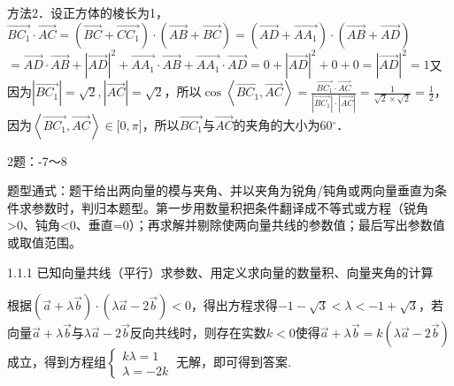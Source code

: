 方法2．设正方体的棱长为1，\(\overrightarrow{BC_{1}} \cdot \overrightarrow{AC} = \allowbreak\left( \overrightarrow{BC} + \overrightarrow{CC_{1}} \right) \cdot \allowbreak\left( \overrightarrow{AB} + \overrightarrow{BC} \right) = \allowbreak\left( \overrightarrow{AD} + \overrightarrow{AA_{1}} \right) \cdot \allowbreak\left( \overrightarrow{AB} + \overrightarrow{AD} \right)\)\(= \overrightarrow{AD} \cdot \overrightarrow{AB} + \left| \overrightarrow{AD} \right|^{2} + \overrightarrow{AA_{1}} \cdot \overrightarrow{AB} + \overrightarrow{AA_{1}} \cdot \overrightarrow{AD} = 0 + \left| \overrightarrow{AD} \right|^{2} + 0 + 0 = \allowbreak\left| \overrightarrow{AD} \right|^{2} = 1\)又因为\(\left| \overrightarrow{BC_{1}} \right| = \sqrt{2},\left| \overrightarrow{AC} \right| = \sqrt{2}\)，所以\(\cos\left\langle \overrightarrow{BC_{1}},\overrightarrow{AC} \right\rangle = \frac{\overrightarrow{BC_{1}} \cdot \overrightarrow{AC}}{\left| \overrightarrow{BC_{1}} \right| \cdot \allowbreak\left| \overrightarrow{AC} \right|} = \frac{1}{\sqrt{2} \times \sqrt{2}} = \frac{1}{2}\)，
因为\(\left\langle \overrightarrow{BC_{1}},\overrightarrow{AC} \right\rangle \in \lbrack 0,\pi\rbrack\)，所以\(\overrightarrow{BC_{1}}\)与\(\overrightarrow{AC}\)的夹角的大小为\(60{^\circ}\)．


2题：-7～8

题型通式：题干给出两向量的模与夹角、并以夹角为锐角/钝角或两向量垂直为条件求参数时，判归本题型。第一步用数量积把条件翻译成不等式或方程（锐角\textgreater0、钝角\textless0、垂直=0）；再求解并剔除使两向量共线的参数值；最后写出参数值或取值范围。


\noindent\hangindent=7mm\quad{}1.1.1 已知向量共线（平行）求参数、用定义求向量的数量积、向量夹角的计算

根据\(\left( \overrightarrow{a} + \lambda\overrightarrow{b} \right) \cdot \allowbreak\left( \lambda\overrightarrow{a} - 2\overrightarrow{b} \right) < 0\)，得出方程求得\(- 1 - \sqrt{3} < \lambda < - 1 + \sqrt{3}\)，若向量\(\overrightarrow{a} + \lambda\overrightarrow{b}\)与\(\lambda\overrightarrow{a} - 2\overrightarrow{b}\)反向共线时，则存在实数\(k < 0\)使得\(\overrightarrow{a} + \lambda\overrightarrow{b} = k(\lambda\overrightarrow{a} - 2\overrightarrow{b})\)成立，得到方程组\(\left\{ \begin{array}{r}
k\lambda = 1 \\
\lambda = - 2k
\end{array} \right.\ \)无解，即可得到答案.

